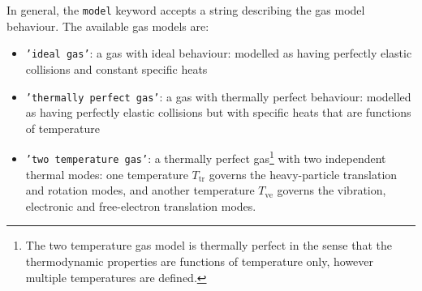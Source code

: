 \medskip
In general, the \texttt{model} keyword accepts a string describing
the gas model behaviour.
The available gas models are:
\begin{itemize}
 \item \texttt{'ideal gas'}: a gas with ideal behaviour: modelled as having perfectly elastic collisions
                             and constant specific heats
 \item \texttt{'thermally perfect gas'}: a gas with thermally perfect behaviour: modelled as having perfectly
                             elastic collisions but with specific heats that are functions of temperature
 \item \texttt{'two temperature gas'}: a thermally perfect gas\footnote{The two temperature gas model is thermally
                             perfect in the sense that the thermodynamic properties are functions
                             of temperature only, however multiple temperatures are defined.} with two independent
                             thermal modes: one temperature $T_\text{tr}$ governs the heavy-particle translation 
                             and rotation modes, and another temperature $T_\text{ve}$ governs the vibration, 
                             electronic and free-electron translation modes.

\end{itemize}
